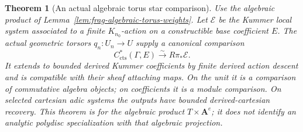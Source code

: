 \documentclass[11pt]{article}
\newtheorem{theorem}{Theorem}[section]
\theoremstyle{definition}
\theoremstyle{remark}
\begin{document}
\begin{theorem}[An actual algebraic torus star comparison]
\label{thm:frag-algebraic-torus-star}
Use the algebraic product of Lemma~\ref{lem:frag-algebraic-torus-weights}.
Let $\mathcal E$ be the Kummer local system associated to a finite
$K_{n_0}$-action on a constructible base coefficient $E$.  The actual
geometric torsors $q_n:U_n\to U$ supply a canonical comparison
\[
 C^*_{\mathrm{cts}}(\Gamma,E)
 \xrightarrow{\sim} R\pi_*\mathcal E.
\]
It extends to bounded derived Kummer coefficients by finite derived
action descent and is compatible with their sheaf attaching maps.
On the unit it is a comparison of commutative algebra objects; on
coefficients it is a module comparison.  On selected cartesian adic
systems the outputs have bounded derived-cartesian recovery.
This theorem is for the algebraic product $T\times\mathbf A^e$;
it does not identify an analytic polydisc specialization with that
algebraic projection.
\end{theorem}
\end{document}
